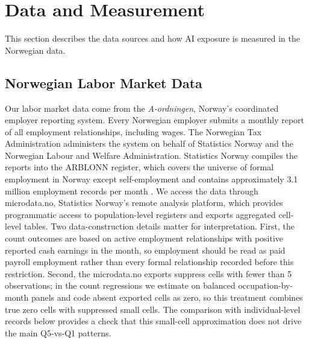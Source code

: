 \documentclass[12pt]{article}
\begin{document}
\section{Data and Measurement}\label{sec:data}
This section describes the data sources and how AI exposure is measured in the Norwegian data.
\subsection{Norwegian Labor Market Data}\label{sec:data:labor}

Our labor market data come from the \emph{A-ordningen}, Norway's coordinated employer reporting system. Every Norwegian employer submits a monthly report of all employment relationships, including wages. The Norwegian Tax Administration administers the system on behalf of Statistics Norway and the Norwegian Labour and Welfare Administration. Statistics Norway compiles the reports into the ARBLONN register, which covers the universe of formal employment in Norway except self-employment and contains approximately 3.1 million employment records per month \citep{ssb_arblonn_doc}. We access the data through microdata.no, Statistics Norway's remote analysis platform, which provides programmatic access to population-level registers and exports aggregated cell-level tables. Two data-construction details matter for interpretation. First, the count outcomes are based on active employment relationships with positive reported cash earnings in the month, so employment should be read as paid payroll employment rather than every formal relationship recorded before this restriction. Second, the microdata.no exports suppress cells with fewer than 5 observations; in the count regressions we estimate on balanced occupation-by-month panels and code absent exported cells as zero, so this treatment combines true zero cells with suppressed small cells. The comparison with individual-level records below provides a check that this small-cell approximation does not drive the main Q5-vs-Q1 patterns.
\end{document}
